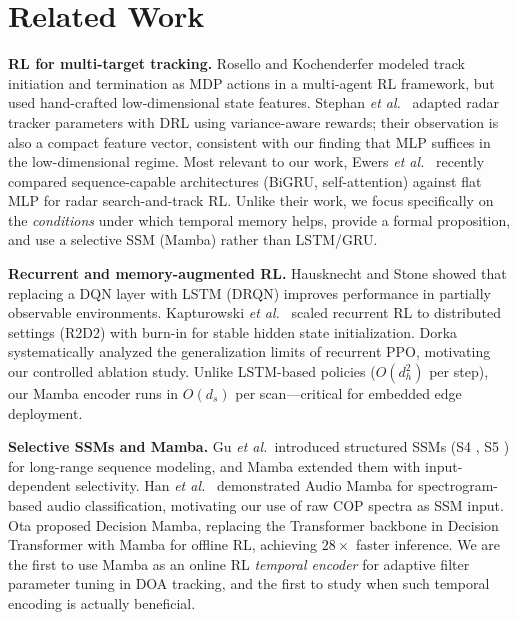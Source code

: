 \documentclass[conference]{IEEEtran}
\begin{document}
\section{Related Work}
\label{sec:related}

\textbf{RL for multi-target tracking.}
Rosello and Kochenderfer \cite{rosello2018marlmot} modeled track
initiation and termination as MDP actions in a multi-agent RL
framework, but used hand-crafted low-dimensional state features.
Stephan \emph{et al.}\ \cite{stephan2022scene} adapted radar tracker
parameters with DRL using variance-aware rewards; their observation
is also a compact feature vector, consistent with our finding that
MLP suffices in the low-dimensional regime.
Most relevant to our work, Ewers \emph{et al.}\ \cite{ewers2025multitarget}
recently compared sequence-capable architectures (BiGRU,
self-attention) against flat MLP for radar search-and-track RL.
Unlike their work, we focus specifically on the \emph{conditions}
under which temporal memory helps, provide a formal proposition, and
use a selective SSM (Mamba) rather than LSTM/GRU.

\textbf{Recurrent and memory-augmented RL.}
Hausknecht and Stone \cite{hausknecht2015drqn} showed that replacing
a DQN layer with LSTM (DRQN) improves performance in partially
observable environments.
Kapturowski \emph{et al.}\ \cite{kapturowski2019r2d2} scaled recurrent
RL to distributed settings (R2D2) with burn-in for stable hidden
state initialization.
Dorka \cite{dorka2022recurrent} systematically analyzed the
generalization limits of recurrent PPO, motivating our controlled
ablation study.
Unlike LSTM-based policies ($O(d_h^2)$ per step), our Mamba encoder
runs in $O(d_s)$ per scan---critical for embedded edge deployment.

\textbf{Selective SSMs and Mamba.}
Gu \emph{et al.}\ introduced structured SSMs (S4 \cite{gu2022s4},
S5 \cite{smith2023s5}) for long-range sequence modeling, and Mamba
\cite{gu2023mamba} extended them with input-dependent selectivity.
Han \emph{et al.}\ \cite{han2024audiomamba} demonstrated Audio Mamba
for spectrogram-based audio classification, motivating our use of
raw COP spectra as SSM input.
Ota \cite{ota2024decisionmamba} proposed Decision Mamba, replacing
the Transformer backbone in Decision Transformer with Mamba for
offline RL, achieving $28\times$ faster inference.
We are the first to use Mamba as an online RL \emph{temporal encoder}
for adaptive filter parameter tuning in DOA tracking, and the first
to study when such temporal encoding is actually beneficial.
\end{document}
